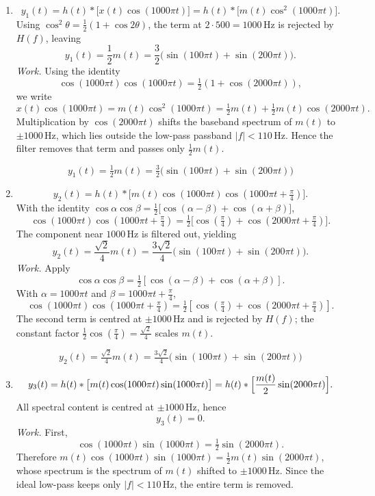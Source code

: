 \documentclass[12pt]{article}
\newcommand{\answer}[1]{\boxed{\;#1\;}}
\begin{document}
\begin{enumerate}[label=\textbf{(\alph*)}]
  \item
    \[
      y_1(t)
      = h(t) * \bigl[x(t)\cos(1000\pi t)\bigr]
      = h(t) * \bigl[m(t)\cos^2(1000\pi t)\bigr].
    \]
    Using $\cos^2\theta = \tfrac{1}{2}\left(1+\cos 2\theta\right)$, the term at $2\cdot500=1000\,\text{Hz}$ is rejected by $H(f)$, leaving
    \[
      y_1(t) = \frac{1}{2}m(t)
              = \frac{3}{2}\bigl(\sin(100\pi t) + \sin(200\pi t)\bigr).
    \]
    \emph{Work.} Using the identity
    \[
      \cos(1000\pi t)\cos(1000\pi t)=\tfrac{1}{2}\!\left(1+\cos(2000\pi t)\right),
    \]
    we write
    \[
      x(t)\cos(1000\pi t) = m(t)\cos^2(1000\pi t)
      = \tfrac{1}{2}m(t) + \tfrac{1}{2}m(t)\cos(2000\pi t).
    \]
    Multiplication by \(\cos(2000\pi t)\) shifts the baseband spectrum of \(m(t)\) to \(\pm 1000\,\text{Hz}\), which lies outside the low-pass passband \(|f|<110\,\text{Hz}\). Hence the filter removes that term and passes only \(\tfrac{1}{2}m(t)\).

    \[
      \answer{y_1(t)=\tfrac{1}{2}m(t)=\tfrac{3}{2}\bigl(\sin(100\pi t)+\sin(200\pi t)\bigr)}
    \]

  \item
    \[
      y_2(t) = h(t) * \bigl[m(t)\cos(1000\pi t)\cos(1000\pi t+\tfrac{\pi}{4})\bigr].
    \]
    With the identity $\cos\alpha\cos\beta = \tfrac{1}{2}\bigl[\cos(\alpha-\beta) + \cos(\alpha+\beta)\bigr]$,
    \[
      \cos(1000\pi t)\cos(1000\pi t+\tfrac{\pi}{4})
      = \tfrac{1}{2}\bigl[\cos(\tfrac{\pi}{4}) + \cos(2000\pi t + \tfrac{\pi}{4})\bigr].
    \]
    The component near $1000\,\text{Hz}$ is filtered out, yielding
    \[
      y_2(t) = \frac{\sqrt{2}}{4}m(t)
              = \frac{3\sqrt{2}}{4}\bigl(\sin(100\pi t) + \sin(200\pi t)\bigr).
    \]
    \emph{Work.} Apply
    \[
      \cos\alpha\cos\beta=\tfrac{1}{2}\!\left[\cos(\alpha-\beta)+\cos(\alpha+\beta)\right].
    \]
    With \(\alpha=1000\pi t\) and \(\beta=1000\pi t+\tfrac{\pi}{4}\),
    \[
      \cos(1000\pi t)\cos(1000\pi t+\tfrac{\pi}{4})
      = \tfrac{1}{2}\!\left[\cos(\tfrac{\pi}{4})+\cos(2000\pi t+\tfrac{\pi}{4})\right].
    \]
    The second term is centred at \(\pm1000\,\text{Hz}\) and is rejected by \(H(f)\); the constant factor \(\tfrac{1}{2}\cos(\tfrac{\pi}{4})=\tfrac{\sqrt{2}}{4}\) scales \(m(t)\).

    \[
      \answer{y_2(t)=\tfrac{\sqrt{2}}{4}m(t)=\tfrac{3\sqrt{2}}{4}\bigl(\sin(100\pi t)+\sin(200\pi t)\bigr)}
    \]

  \item
    \[
      y_3(t) = h(t) * \bigl[m(t)\cos(1000\pi t)\sin(1000\pi t)\bigr]
             = h(t) * \Bigl[\frac{m(t)}{2}\sin(2000\pi t)\Bigr].
    \]
    All spectral content is centred at $\pm 1000\,\text{Hz}$, hence
    \[
      y_3(t) = 0.
    \]
    \emph{Work.} First,
    \[
      \cos(1000\pi t)\sin(1000\pi t)=\tfrac{1}{2}\sin(2000\pi t).
    \]
    Therefore \(m(t)\cos(1000\pi t)\sin(1000\pi t)=\tfrac{1}{2}m(t)\sin(2000\pi t)\), whose spectrum is the spectrum of \(m(t)\) shifted to \(\pm1000\,\text{Hz}\). Since the ideal low-pass keeps only \(|f|<110\,\text{Hz}\), the entire term is removed.


\end{enumerate}
\end{document}
